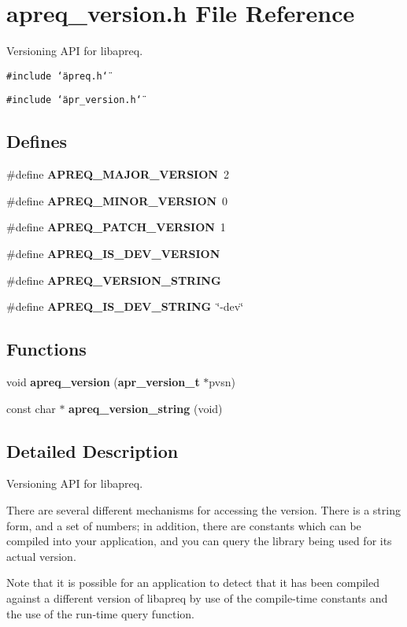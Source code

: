 \section{apreq\_\-version.h File Reference}
\label{apreq__version_8h}
Versioning API for libapreq. 


{\tt \#include \char`\"{}apreq.h\char`\"{}}\par
{\tt \#include \char`\"{}apr\_\-version.h\char`\"{}}\par
\subsection*{Defines}
\begin{CompactItemize}
\item 
\#define {\bf APREQ\_\-MAJOR\_\-VERSION}\ 2
\item 
\#define {\bf APREQ\_\-MINOR\_\-VERSION}\ 0
\item 
\#define {\bf APREQ\_\-PATCH\_\-VERSION}\ 1
\item 
\#define {\bf APREQ\_\-IS\_\-DEV\_\-VERSION}
\item 
\#define {\bf APREQ\_\-VERSION\_\-STRING}
\item 
\#define {\bf APREQ\_\-IS\_\-DEV\_\-STRING}\ \char`\"{}-dev\char`\"{}
\end{CompactItemize}
\subsection*{Functions}
\begin{CompactItemize}
\item 
void {\bf apreq\_\-version} ({\bf apr\_\-version\_\-t} $\ast$pvsn)
\item 
const char $\ast$ {\bf apreq\_\-version\_\-string} (void)
\end{CompactItemize}


\subsection{Detailed Description}
Versioning API for libapreq.

There are several different mechanisms for accessing the version. There is a string form, and a set of numbers; in addition, there are constants which can be compiled into your application, and you can query the library being used for its actual version.

Note that it is possible for an application to detect that it has been compiled against a different version of libapreq by use of the compile-time constants and the use of the run-time query function.

